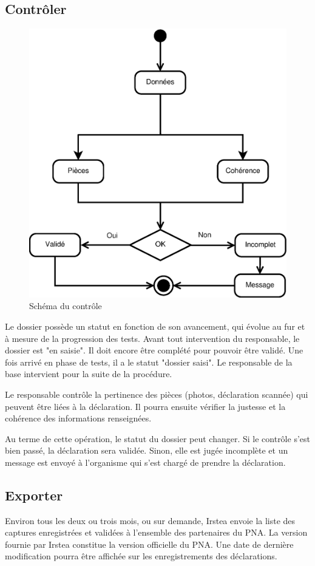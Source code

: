 \documentclass[12pt,a4paper]{article}
\begin{document}
\subsection{Contrôler}
\begin{figure}[h]
\centering
\includegraphics[width=\textwidth]{schemaControle.eps}
\caption{Schéma du contrôle}
\end{figure}
Le dossier possède un statut en fonction de son avancement, qui évolue au fur et à mesure de la progression des tests. Avant tout intervention du responsable, le dossier est "en saisie". Il doit encore être complété pour pouvoir être validé. Une fois arrivé en phase de tests, il a le statut "dossier saisi". Le responsable de la base intervient pour la suite de la procédure.

Le responsable contrôle la pertinence des pièces (photos, déclaration scannée) qui peuvent être liées à la déclaration. Il pourra ensuite vérifier la justesse et la cohérence des informations renseignées. 

Au terme de cette opération, le statut du dossier peut changer. Si le contrôle s'est bien passé, la déclaration sera validée. Sinon, elle est jugée incomplète et un message est envoyé à l'organisme qui s'est chargé de prendre la déclaration. 

\subsection{Exporter}

Environ tous les deux ou trois mois, ou sur demande, Irstea envoie la liste des captures enregistrées et validées à l'ensemble des partenaires du PNA. La version fournie par Irstea constitue la version officielle du PNA. 
Une date de dernière modification pourra être affichée sur les enregistrements des déclarations. 
\end{document}
